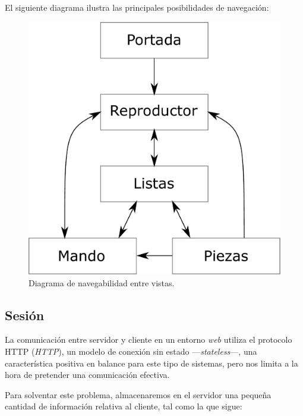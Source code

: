 El siguiente diagrama ilustra las principales posibilidades de navegación:

\smallskip

\begin{figure}[H]
	\noindent \begin{centering}
		\includegraphics[width=\linewidth/2]{capitulo4/navegacion}
		\par\end{centering}
	\smallskip
	\caption{\label{fig:navegacion} Diagrama de navegabilidad entre vistas.}
\end{figure} 

\smallskip

\subsection{Sesión}

La comunicación entre servidor y cliente en un entorno \textit{web} utiliza el protocolo \acrshort{HTTP} (\textit{\acrlong{HTTP}}), un modelo de conexión sin estado ---\textit{stateless}---, una característica positiva en balance para este tipo de sistemas, pero nos limita a la hora de pretender una comunicación efectiva.

Para solventar este problema, almacenaremos en el servidor una pequeña cantidad de información relativa al cliente, tal como la que sigue:

